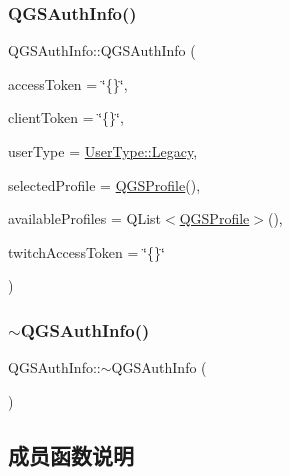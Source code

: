 \subsubsection{\texorpdfstring{Q\+G\+S\+Auth\+Info()}{QGSAuthInfo()}}
{\footnotesize\ttfamily Q\+G\+S\+Auth\+Info\+::\+Q\+G\+S\+Auth\+Info (\begin{DoxyParamCaption}\item[{const Q\+String \&}]{access\+Token = {\ttfamily \char`\"{}\{\}\char`\"{}},  }\item[{const Q\+String \&}]{client\+Token = {\ttfamily \char`\"{}\{\}\char`\"{}},  }\item[{const Q\+String \&}]{user\+Type = {\ttfamily \mbox{\hyperlink{namespace_user_type_a938c1c88af5b7d51492731caac017683}{User\+Type\+::\+Legacy}}},  }\item[{const \mbox{\hyperlink{class_q_g_s_auth_info_1_1_q_g_s_profile}{Q\+G\+S\+Profile}} \&}]{selected\+Profile = {\ttfamily \mbox{\hyperlink{class_q_g_s_auth_info_1_1_q_g_s_profile}{Q\+G\+S\+Profile}}()},  }\item[{const Q\+List$<$ \mbox{\hyperlink{class_q_g_s_auth_info_1_1_q_g_s_profile}{Q\+G\+S\+Profile}} $>$ \&}]{available\+Profiles = {\ttfamily QList$<$\mbox{\hyperlink{class_q_g_s_auth_info_1_1_q_g_s_profile}{Q\+G\+S\+Profile}}$>$()},  }\item[{const Q\+String \&}]{twitch\+Access\+Token = {\ttfamily \char`\"{}\{\}\char`\"{}} }\end{DoxyParamCaption})}

\mbox{\label{class_q_g_s_auth_info_abe2b5e9595bbb8937347d5593f734a4d}} 
\subsubsection{\texorpdfstring{$\sim$\+Q\+G\+S\+Auth\+Info()}{~QGSAuthInfo()}}
{\footnotesize\ttfamily Q\+G\+S\+Auth\+Info\+::$\sim$\+Q\+G\+S\+Auth\+Info (\begin{DoxyParamCaption}{ }\end{DoxyParamCaption})}



\subsection{成员函数说明}
\mbox{\label{class_q_g_s_auth_info_afb0d793a2d7012e941a76de47d43da0b}} 
